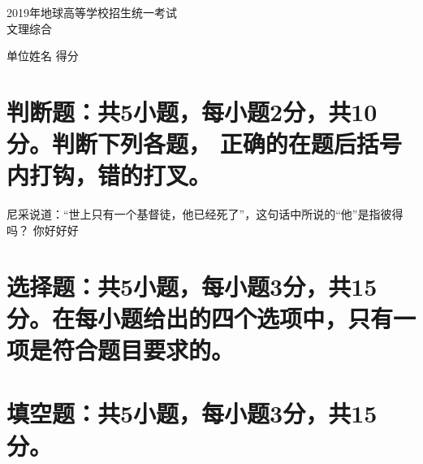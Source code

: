 \documentclass[answer=true,countunit=section,sheetsize=A3,paperprint=double,scoretable]{simplexam}
\begin{document}
\begin{center}
\heiti  2019年地球高等学校招生统一考试\\ %
    文理综合 %
\end{center}

\begin{center}
\fangsong 单位\underline{\hspace{6em}}姓名\underline{\hspace{6em}}
得分\underline{\hspace{6em}} %
\end{center}


%
%
\assesstaball

\section{判断题：共5小题，每小题2分，共10分。判断下列各题，
正确的在题后括号内打钩，错的打叉。}

{



\begin{question}
尼采说道：“世上只有一个基督徒，他已经死了”，这句话中所说的“他”是指彼得吗？
你好好好 
\end{question}

}

\section{选择题：共5小题，每小题3分，共15分。在每小题给出的四个选项中，只有一项是符合题目要求的。}

{


}

\section{填空题：共5小题，每小题3分，共15分。}
\end{document}
